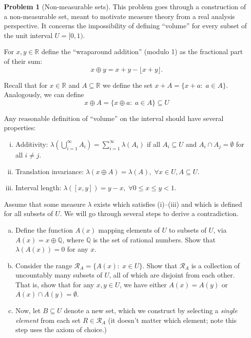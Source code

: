 \documentclass{article}
\newcommand{\cR}{\mathcal{R}}
\newcommand{\QQ}{\mathbb{Q}}
\newcommand{\RR}{\mathbb{R}}
\theoremstyle{definition}
\newtheorem{problem}{Problem}
\begin{document}
\begin{problem}[Non-measurable sets]
\label{prob:non-measurable}
This problem goes through a construction of a non-measurable set, meant to motivate measure theory from a real analysis perspective. It concerns the impossibility of defining ``volume'' for every subset of the unit interval $U=[0,1)$.

For $x,y \in \RR$ define the ``wraparound addition'' (modulo 1) as the fractional part of their sum:
\[
x \oplus y = x + y - \lfloor x + y \rfloor.
\]

Recall that for $x \in \RR$ and $A \subseteq \RR$ we define the set $x + A = \{x + a:\; a \in A\}$. Analogously, we can define 
\[
x \oplus A = \{x \oplus a:\; a \in A\} \subseteq U
\]

Any reasonable definition of ``volume'' on the interval should have several properties:
\begin{enumerate}[(i)]
\item Additivity: $\lambda(\bigcup_{i=1}^\infty A_i) = \sum_{i=1}^\infty \lambda(A_i)$ if all $A_i\subseteq U$ and $A_i \cap A_j = \emptyset$ for all $i \neq j$.
\item Translation invariance: $\lambda(x \oplus A) = \lambda(A), \;\forall x\in U, A\subseteq U$.
\item Interval length: $\lambda([x,y]) = y - x, \;\forall 0 \leq x \leq y < 1$.
\end{enumerate}
Assume that some measure $\lambda$ exists which satisfies (i)--(iii) and which is defined for all subsets of $U$. We will go through several steps to derive a contradiction.

\begin{enumerate}[(a)]
\item Define the function $A(x)$ mapping elements of $U$ to subsets of $U$, via $A(x) = x \oplus \QQ$, where $\QQ$ is the set of rational numbers. Show that $\lambda(A(x)) = 0$ for any $x$.


\item Consider the range $\cR_A = \{A(x):\; x\in U\}$. Show that $\cR_A$ is a collection of uncountably many subsets of $U$, all of which are disjoint from each other. That is, show that for any $x,y\in U$, we have either $A(x)=A(y)$ or $A(x) \cap A(y) = \emptyset$.



\item Now, let $B\subseteq U$ denote a new set, which we construct by selecting a {\em single element} from each set $R\in\cR_A$ (it doesn't matter which element; note this step uses the axiom of choice.)


\end{enumerate}
\end{problem}
\end{document}
